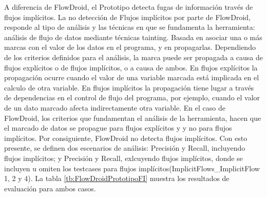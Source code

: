 A diferencia de FlowDroid, el Prototipo detecta fugas de información través de
flujos implícitos. La no detección de Flujos implícitos por parte de FlowDroid,
responde al tipo de análisis y las técnicas en que se fundamenta la herramienta:
análisis de flujo de datos mediante técnicas tainting. Basada en 
% 
% 
asociar una o más marcas
con el valor de los datos en el programa, y en propagarlas. Dependiendo de los
criterios definidos para el análisis, la marca puede ser propagada a causa de
flujos explícitos o de flujos implícitos, o a causa de ambos. En flujos
explícitos la propagación ocurre cuando el valor de una variable marcada está
implicada en el calculo de otra variable. En flujos implícitos la propagación
tiene lugar a través de dependencias en el control de flujo del programa, por
ejemplo, cuando el valor de un dato marcado afecta indirectamente otra variable.\newline 
En el caso de FlowDroid, los criterios que fundamentan el análisis de la
herramienta, hacen que el marcado de datos se propague para flujos explícitos y
y no para flujos implícitos. Por consiguiente, FlowDroid no detecta flujos
implícitos.\newline
Con esto presente, se definen dos escenarios de análisis: Precisión y Recall,
incluyendo flujos implícitos; y  Precisión y Recall, exlcuyendo flujos
implícitos, donde se incluyen u omiten los testcases para flujos
implícitos(ImplicitFlows\_ImplicitFlow 1, 2 y 4).
La tabla \ref{tb:FlowDroidPrototipoFI} muestra los resultados de evaluación para
ambos casos.\newline

